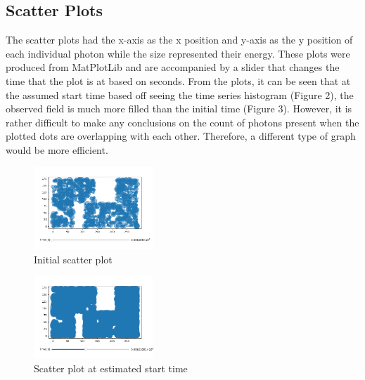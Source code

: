 \documentclass[final,5p,times,twocolumn,authoryear]{elsarticle}
\begin{document}
\subsection{Scatter Plots}
The scatter plots had the x-axis as the x position and y-axis as the y position of each individual photon while the size represented their energy. These plots were produced from MatPlotLib and are accompanied by a slider that changes the time that the plot is at based on seconds. From the plots, it can be seen that at the assumed start time based off seeing the time series histogram (Figure 2), the observed field is much more filled than the initial time (Figure 3). However, it is rather difficult to make any conclusions on the count of photons present when the plotted dots are overlapping with each other. Therefore, a different type of graph would be more efficient.
\begin{figure}[H]
	\centering 
	\includegraphics[width=0.4\textwidth]{images/ScatterPlot.png}	
	\caption{Initial scatter plot} 
	\label{fig_mom0}%
\end{figure}
\begin{figure}[H]
	\centering 
	\includegraphics[width=0.4\textwidth]{images/ScatterPlot2.png}	
	\caption{Scatter plot at estimated start time} 
	\label{fig_mom0}%
\end{figure}
\end{document}
